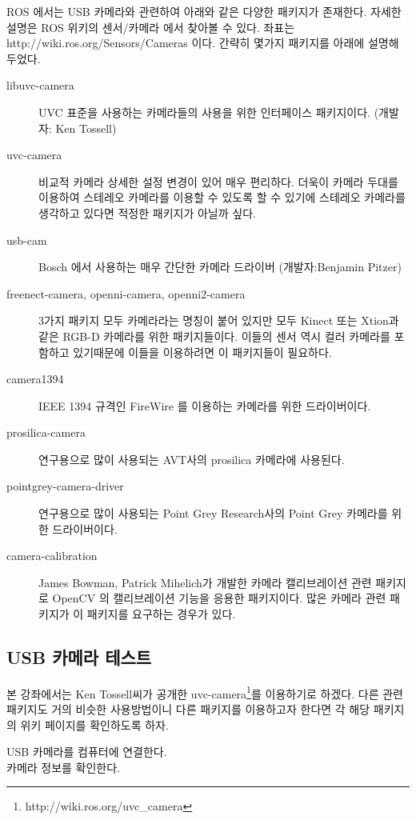 ROS 에서는 USB 카메라와 관련하여 아래와 같은 다양한 패키지가 존재한다. 자세한 설명은 ROS 위키의 센서/카메라 에서 찾아볼 수 있다. 좌표는 http://wiki.ros.org/Sensors/Cameras 이다. 간략히 몇가지 패키지를 아래에 설명해 두었다.

\begin{description}
\item[libuvc-camera] UVC 표준을 사용하는 카메라들의 사용을 위한 인터페이스 패키지이다. (개발자: Ken Tossell)
\item[uvc-camera] 비교적 카메라 상세한 설정 변경이 있어 매우 편리하다. 더욱이 카메라 두대를 이용하여 스테레오 카메라를 이용할 수 있도록 할 수 있기에 스테레오 카메라를 생각하고 있다면 적정한 패키지가 아닐까 싶다.
\item[usb-cam] Bosch 에서 사용하는 매우 간단한 카메라 드라이버 (개발자:Benjamin Pitzer)
\item[freenect-camera, openni-camera, openni2-camera] 3가지 패키지 모두 카메라라는 명칭이 붙어 있지만 모두 Kinect 또는 Xtion과 같은 RGB-D 카메라를 위한 패키지들이다. 이들의 센서 역시 컬러 카메라를 포함하고 있기때문에 이들을 이용하려면 이 패키지들이 필요하다.
\item[camera1394] IEEE 1394 규격인 FireWire 를 이용하는 카메라를 위한 드라이버이다.
\item[prosilica-camera] 연구용으로 많이 사용되는 AVT사의 prosilica 카메라에 사용된다.
\item[pointgrey-camera-driver] 연구용으로 많이 사용되는 Point Grey Research사의 Point Grey 카메라를 위한 드라이버이다.
\item[camera-calibration] James Bowman, Patrick Mihelich가 개발한 카메라 캘리브레이션 관련 패키지로 OpenCV 의 캘리브레이션 기능을 응용한 패키지이다. 많은 카메라 관련 패키지가 이 패키지를 요구하는 경우가 있다.
\end{description}

\subsection{USB 카메라 테스트}

본 강좌에서는 Ken Tossell씨가 공개한 uvc-camera\footnote{http://wiki.ros.org/uvc\_camera}를 이용하기로 하겠다. 다른 관련 패키지도 거의 비슷한 사용방법이니 다른 패키지를 이용하고자 한다면 각 해당 패키지의 위키 페이지를 확인하도록 하자.

\setcounter{num}{0}

\vspace{\baselineskip}
\noindent
{}\circled{\thenum} USB 카메라를 컴퓨터에 연결한다.\\
\circled{\thenum} 카메라 정보를 확인한다.


